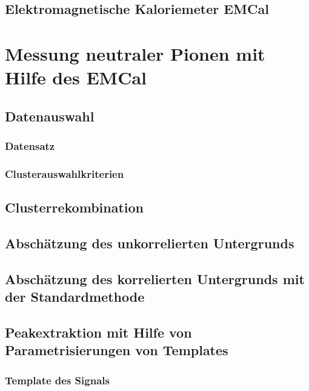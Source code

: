 \documentclass[11pt]{article}
\renewcommand{\,}{,\!} %
\begin{document}
\subsection{Elektromagnetische Kaloriemeter EMCal} \label{s2s2}

\newpage
\section{Messung neutraler Pionen mit Hilfe des EMCal} \label{s3}

\subsection{Datenauswahl} \label{s3s1}

\subsubsection{Datensatz} \label{s3s1s1}


\subsubsection{Clusterauswahlkriterien} \label{s3s1s2}


\subsection{Clusterrekombination} \label{s3s2}

\subsection{Absch{\"a}tzung des unkorrelierten Untergrunds} \label{s3s3}

\subsection{Absch{\"a}tzung des korrelierten Untergrunds mit der Standardmethode} \label{s3s4}


\subsection{Peakextraktion mit Hilfe von Parametrisierungen von Templates} \label{s3s5}


\subsubsection{Template des Signals} \label{s3s5s1}

\end{document}
